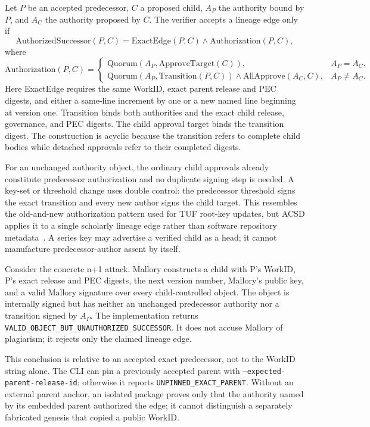 \documentclass[11pt]{article}
\begin{document}
Let $P$ be an accepted predecessor, $C$ a proposed child, $A_P$ the authority
bound by $P$, and $A_C$ the authority proposed by $C$. The verifier accepts a
lineage edge only if
\[
 \mathrm{AuthorizedSuccessor}(P,C) = \mathrm{ExactEdge}(P,C) \land
 \mathrm{Authorization}(P,C),
\]
where
\[
 \mathrm{Authorization}(P,C)=
 \begin{cases}
  \mathrm{Quorum}(A_P,\mathrm{ApproveTarget}(C)), & A_P=A_C,\\
  \mathrm{Quorum}(A_P,\mathrm{Transition}(P,C)) \land
  \mathrm{AllApprove}(A_C,C), & A_P\ne A_C.
 \end{cases}
\]
Here \textsf{ExactEdge} requires the same WorkID, exact parent release and PEC
digests, and either a same-line increment by one or a new named line beginning
at version one. \textsf{Transition} binds both authorities and the exact child
release, governance, and PEC digests. The child approval target binds the
transition digest. The construction is acyclic because the transition refers
to complete child bodies while detached approvals refer to their completed
digests.

For an unchanged authority object, the ordinary child approvals already constitute
predecessor authorization and no duplicate signing step is needed. A key-set or
threshold change uses double control: the predecessor threshold signs the exact
transition and every new author signs the child target. This resembles the
old-and-new authorization pattern used for TUF root-key updates, but ACSD
applies it to a single scholarly lineage edge rather than software repository
metadata~\cite{tufspec}. A series key may advertise a verified child as a head;
it cannot manufacture predecessor-author assent by itself.

Consider the concrete n+1 attack. Mallory constructs a child with P's WorkID,
P's exact release and PEC digests, the next version number, Mallory's public
key, and a valid Mallory signature over every child-controlled object. The
object is internally signed but has neither an unchanged predecessor authority
nor a transition signed by $A_P$. The implementation returns
\texttt{VALID\_OBJECT\_BUT\_UNAUTHORIZED\_SUCCESSOR}. It does not accuse
Mallory of plagiarism; it rejects only the claimed lineage edge.

This conclusion is relative to an accepted exact predecessor, not to the
WorkID string alone. The CLI can pin a previously accepted parent with
\texttt{--expected-parent-release-id}; otherwise it reports
\texttt{UNPINNED\_EXACT\_PARENT}. Without an external parent anchor, an isolated
package proves only that the authority named by its embedded parent authorized
the edge; it cannot distinguish a separately fabricated genesis that copied a
public WorkID.
\end{document}
